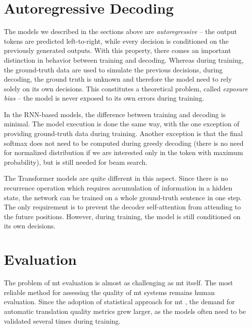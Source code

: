 \section{Autoregressive Decoding}
\label{sec:training-vs-inference}

The models we described in the sections above are \emph{autoregressive} -- the
output tokens are predicted left-to-right, while every decision is conditioned
on the previously generated outputs. With this property, there comes an
important distinction in behavior between training and decoding. Whereas during
training, the ground-truth data are used to simulate the previous decisions,
during decoding, the ground truth is unknown and therefore the model need to
rely solely on its own decisions. This constitutes a theoretical problem,
called \emph{exposure bias} -- the model is never exposed to its own errors
during training.

In the RNN-based models, the difference between training and decoding is
minimal. The model execution is done the same way, with the one exception of
providing ground-truth data during training. Another exception is that the final
softmax does not need to be computed during greedy decoding (there is no need
for normalized distribution if we are interested only in the token with maximum
probability), but is still needed for beam search.

The Transformer models are quite different in this aspect. Since there is no
recurrence operation which requires accumulation of information in a hidden
state, the network can be trained on a whole ground-truth sentence in one step.
The only requirement is to prevent the decoder self-attention from attending to
the future positions. However, during training, the model is still conditioned
on its own decisions.




\section{Evaluation}
\label{sec:evaluation}

The problem of \gls{mt} evaluation is almost as challenging as \gls{mt} itself.
The most reliable method for assessing the quality of \gls{mt} systems remains
human evaluation.  Since the adoption of statistical approach for \gls{mt}
\citep{brown-etal-1993-mathematics,koehn-etal-2003-statistical}, the demand for
automatic translation quality metrics grew larger, as the models often need to
be validated several times during training.

